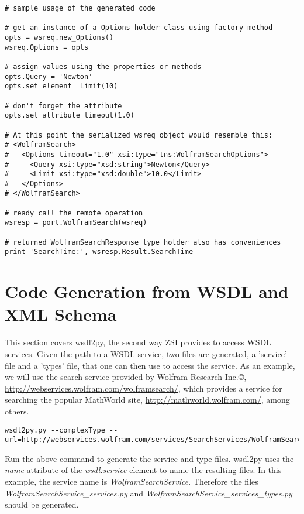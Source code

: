 \begin{verbatim}
# sample usage of the generated code

# get an instance of a Options holder class using factory method
opts = wsreq.new_Options()
wsreq.Options = opts

# assign values using the properties or methods
opts.Query = 'Newton'
opts.set_element__Limit(10)

# don't forget the attribute
opts.set_attribute_timeout(1.0)

# At this point the serialized wsreq object would resemble this:
# <WolframSearch>
#   <Options timeout="1.0" xsi:type="tns:WolframSearchOptions">
#     <Query xsi:type="xsd:string">Newton</Query>
#     <Limit xsi:type="xsd:double">10.0</Limit>
#   </Options>
# </WolframSearch>

# ready call the remote operation
wsresp = port.WolframSearch(wsreq)

# returned WolframSearchResponse type holder also has conveniences
print 'SearchTime:', wsresp.Result.SearchTime
\end{verbatim}

\section{Code Generation from WSDL and XML Schema}

This section covers wsdl2py, the second way ZSI provides to access WSDL
services.  Given the path to a WSDL service, two files are generated, a 
'service' file and a 'types' file, that one can then use to access the
service.  As an example, we will use the search service provided by Wolfram
Research Inc.\copyright{}, \url{http://webservices.wolfram.com/wolframsearch/}, 
which provides a service for searching the popular MathWorld site, 
\url{http://mathworld.wolfram.com/}, among others.

\begin{verbatim}
wsdl2py.py --complexType --url=http://webservices.wolfram.com/services/SearchServices/WolframSearch2.wsdl
\end{verbatim}

Run the above command to generate the service and type files.  wsdl2py uses
the {\it name} attribute of the {\it wsdl:service} element to name the resulting files.
In this example, the service name is {\it WolframSearchService}.  Therefore the files
{\it WolframSearchService_services.py} and {\it WolframSearchService_services_types.py}
should be generated.

